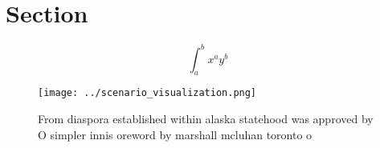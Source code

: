 \documentclass[a4paper]{article}
\begin{document}
\section{Section}

\[ \int_{a}^{b}{x^{a}y^{b}} \]

\begin{figure}
\centering
\texttt{[image: ../scenario\_visualization.png]}
\caption{From diaspora established within alaska statehood was approved by O simpler innis oreword by marshall mcluhan toronto o
}
\end{figure}
 
\end{document}

